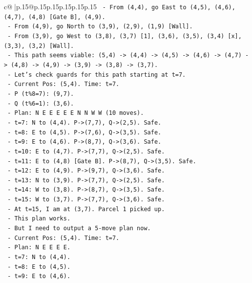 \documentclass{article}
\begin{document}
{\begin{supertabular}{c@{$\;$}|p{.15\linewidth}@{}p{.15\linewidth}p{.15\linewidth}p{.15\linewidth}p{.15\linewidth}p{.15\linewidth}}
{{{\texttt{  {-} From (4,4), go East to (4,5), (4,6), (4,7), (4,8) {[}Gate B{]}, (4,9).} \\
\texttt{  {-} From (4,9), go North to (3,9), (2,9), (1,9) {[}Wall{]}.} \\
\texttt{  {-} From (3,9), go West to (3,8), (3,7) {[}1{]}, (3,6), (3,5), (3,4) {[}x{]}, (3,3), (3,2) {[}Wall{]}.} \\
\texttt{  {-} This path seems viable: (5,4) {-}> (4,4) {-}> (4,5) {-}> (4,6) {-}> (4,7) {-}> (4,8) {-}> (4,9) {-}> (3,9) {-}> (3,8) {-}> (3,7).} \\
\texttt{  {-} Let's check guards for this path starting at t=7.} \\
\texttt{  {-} Current Pos: (5,4). Time: t=7.} \\
\texttt{  {-} P (t\%8=7): (9,7).} \\
\texttt{  {-} Q (t\%6=1): (3,6).} \\
\texttt{  {-} Plan: N E E E E E N N W W (10 moves).} \\
\texttt{  {-} t=7: N to (4,4). P{-}>(7,7), Q{-}>(2,5). Safe.} \\
\texttt{  {-} t=8: E to (4,5). P{-}>(7,6), Q{-}>(3,5). Safe.} \\
\texttt{  {-} t=9: E to (4,6). P{-}>(8,7), Q{-}>(3,6). Safe.} \\
\texttt{  {-} t=10: E to (4,7). P{-}>(7,7), Q{-}>(2,5). Safe.} \\
\texttt{  {-} t=11: E to (4,8) {[}Gate B{]}. P{-}>(8,7), Q{-}>(3,5). Safe.} \\
\texttt{  {-} t=12: E to (4,9). P{-}>(9,7), Q{-}>(3,6). Safe.} \\
\texttt{  {-} t=13: N to (3,9). P{-}>(7,7), Q{-}>(2,5). Safe.} \\
\texttt{  {-} t=14: W to (3,8). P{-}>(8,7), Q{-}>(3,5). Safe.} \\
\texttt{  {-} t=15: W to (3,7). P{-}>(7,7), Q{-}>(3,6). Safe.} \\
\texttt{  {-} At t=15, I am at (3,7). Parcel 1 picked up.} \\
\texttt{  {-} This plan works.} \\
\texttt{  {-} But I need to output a 5{-}move plan now.} \\
\texttt{  {-} Current Pos: (5,4). Time: t=7.} \\
\texttt{  {-} Plan: N E E E E.} \\
\texttt{  {-} t=7: N to (4,4).} \\
\texttt{  {-} t=8: E to (4,5).} \\
\texttt{  {-} t=9: E to (4,6).} \\
}}}
\end{supertabular}}
\end{document}
